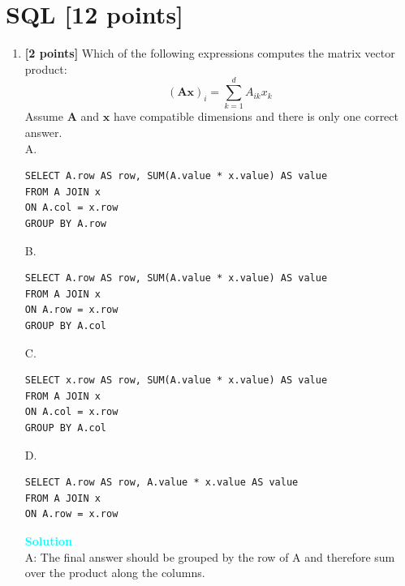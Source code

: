 \documentclass[10pt]{article}
\newenvironment{solution}
    { \begin{mdframed}[backgroundcolor=gray!10] \textcolor{cyan}{\textbf{Solution}} \\}
    {  \end{mdframed}}
\begin{document}
\section{SQL \textbf{[12 points]}}
\begin{enumerate}

	\item \textbf{[2 points]}
	      Which of the following expressions computes the matrix vector product:
	      $$
		      (\mathbf{A} \mathbf{x})_{i}=\sum_{k=1}^{d} A_{i k} x_{k}
	      $$
	      Assume $\mathbf{A}$ and $\mathbf{x}$ have compatible dimensions and there is only one correct answer.\\
	      A.

	      \begin{lstlisting} 
SELECT A.row AS row, SUM(A.value * x.value) AS value 
FROM A JOIN x
ON A.col = x.row
GROUP BY A.row
\end{lstlisting}


	      B.
	      \begin{lstlisting}
SELECT A.row AS row, SUM(A.value * x.value) AS value 
FROM A JOIN x
ON A.row = x.row
GROUP BY A.col
\end{lstlisting}
	      C.
	      \begin{lstlisting} 
SELECT x.row AS row, SUM(A.value * x.value) AS value 
FROM A JOIN x
ON A.col = x.row
GROUP BY A.col
\end{lstlisting}
	      D.
	      \begin{lstlisting}
SELECT A.row AS row, A.value * x.value AS value 
FROM A JOIN x
ON A.row = x.row
\end{lstlisting}

	      \begin{solution}
		      A: The final answer should be grouped by the row of A and therefore sum over the product along the columns.
	      \end{solution}




\end{enumerate}
\end{document}
